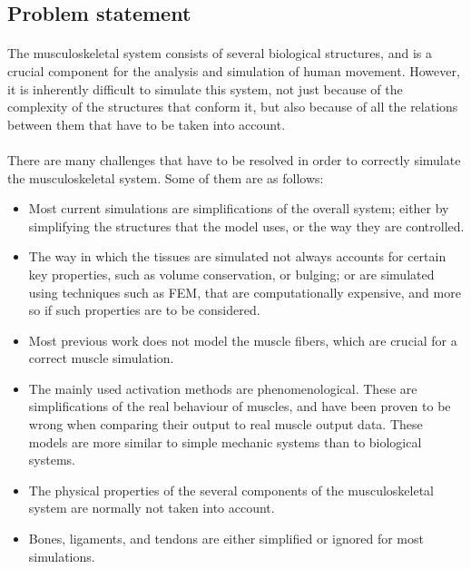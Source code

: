 \subsection{Problem statement}

\paragraph{}The musculoskeletal system consists of several biological structures, and is a crucial component for the analysis and simulation of human movement. However, it is inherently difficult to simulate this system, not just because of the complexity of the structures that conform it, but also because of all the relations between them that have to be taken into account.

\paragraph{}There are many challenges that have to be resolved in order to correctly simulate the musculoskeletal system. Some of them are as follows:

\begin{itemize}
	\item Most current simulations are simplifications of the overall system; either by simplifying the structures that the model uses, or the way they are controlled.  
	\item The way in which the tissues are simulated not always accounts for certain key properties, such as volume conservation, or bulging; or are simulated using techniques such as FEM, that are computationally expensive, and more so if such properties are to be considered.
	\item Most previous work does not model the muscle fibers, which are crucial for a correct muscle simulation.
	\item The mainly used activation methods are phenomenological. These are simplifications of the real behaviour of muscles, and have been proven to be wrong when comparing their output to real muscle output data. These models are more similar to simple mechanic systems than to biological systems. 
	\item The physical properties of the several components of the musculoskeletal system are normally not taken into account.
	\item Bones, ligaments, and tendons are either simplified or ignored for most simulations. 
\end{itemize}

